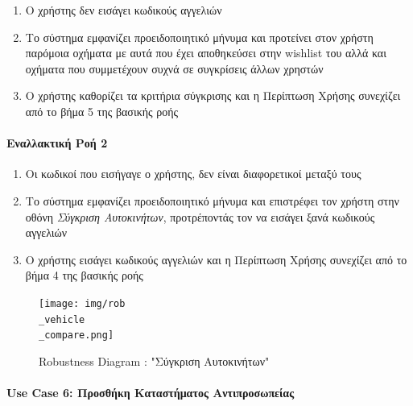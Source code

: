 \documentclass{../ol-softwaremanual}
\begin{document}
	\begin{enumerate}
		\item Ο χρήστης δεν εισάγει κωδικούς αγγελιών 
		\item Το σύστημα εμφανίζει προειδοποιητικό μήνυμα και προτείνει στον χρήστη παρόμοια οχήματα με αυτά που έχει αποθηκεύσει στην \en wishlist \gr του αλλά και οχήματα που συμμετέχουν συχνά σε συγκρίσεις άλλων χρηστών
		\item Ο χρήστης καθορίζει τα κριτήρια σύγκρισης και η Περίπτωση Χρήσης συνεχίζει από το βήμα 5 της βασικής ροής
	\end{enumerate}
	
	\paragraph{Εναλλακτική Ροή 2}
	\begin{enumerate}
		\item Oι κωδικοί που εισήγαγε ο χρήστης, δεν είναι διαφορετικοί μεταξύ τους
		\item Το σύστημα εμφανίζει προειδοποιητικό μήνυμα και επιστρέφει τον χρήστη στην οθόνη \textit{Σύγκριση Αυτοκινήτων}, προτρέποντάς τον να εισάγει ξανά κωδικούς αγγελιών
		\item Ο χρήστης εισάγει κωδικούς αγγελιών και η Περίπτωση Χρήσης συνεχίζει από το βήμα 4 της βασικής ροής		
	\end{enumerate}
	
	
	\begin{figure}[htbp!]
		\texttt{[image: img/rob\\\_vehicle\\\_compare.png]}
		\caption{\en Robustness Diagram : "\gr Σύγκριση Αυτοκινήτων\en"\gr}
	\end{figure}
	
	\newpage
	\centering
	
	\paragraph{\en Use Case 6: \gr Προσθήκη Καταστήματος Αντιπροσωπείας}
	
\end{document}
